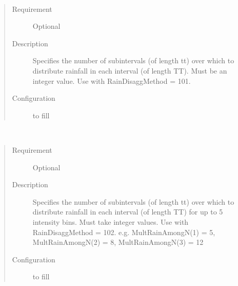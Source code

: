 \documentclass[letterpaper,10pt,english]{sphinxmanual}
\begin{document}

\begin{fulllineitems}
\label{\detokenize{input_files/RunControl/Options_related_to_disaggregation_of_input_data:cmdoption-arg-rainamongn}}~\begin{quote}\begin{description}
\item[{Requirement}] \leavevmode
Optional

\item[{Description}] \leavevmode
Specifies the number of subintervals (of length tt) over which to distribute rainfall in each interval (of length TT). Must be an integer value. Use with RainDisaggMethod = 101.

\item[{Configuration}] \leavevmode
to fill

\end{description}\end{quote}

\end{fulllineitems}


\begin{fulllineitems}
\label{\detokenize{input_files/RunControl/Options_related_to_disaggregation_of_input_data:cmdoption-arg-multrainamongn}}~\begin{quote}\begin{description}
\item[{Requirement}] \leavevmode
Optional

\item[{Description}] \leavevmode
Specifies the number of subintervals (of length tt) over which to distribute rainfall in each interval (of length TT) for up to 5 intensity bins. Must take integer values. Use with RainDisaggMethod = 102. e.g. MultRainAmongN(1) = 5, MultRainAmongN(2) = 8, MultRainAmongN(3) = 12

\item[{Configuration}] \leavevmode
to fill

\end{description}\end{quote}

\end{fulllineitems}
\end{document}
